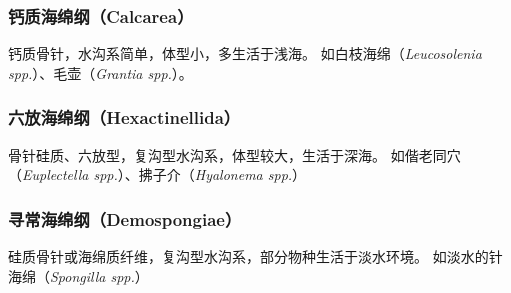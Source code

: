 \documentclass[11pt]{article}
\begin{document}
\subsubsection{钙质海绵纲（Calcarea）}
钙质骨针，水沟系简单，体型小，多生活于浅海。
如白枝海绵（\textit{Leucosolenia spp.}）、毛壶（\textit{Grantia spp.}）。

\subsubsection{六放海绵纲（Hexactinellida）}
骨针硅质、六放型，复沟型水沟系，体型较大，生活于深海。
如偕老同穴（\textit{Euplectella spp.}）、拂子介（\textit{Hyalonema spp.}）

\subsubsection{寻常海绵纲（Demospongiae）}
硅质骨针或海绵质纤维，复沟型水沟系，部分物种生活于淡水环境。
如淡水的针海绵（\textit{Spongilla spp.}）
  
\end{document}
